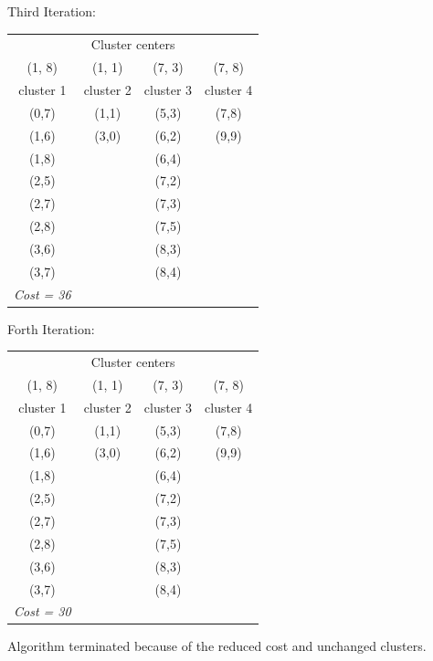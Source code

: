 \documentclass[10pt,a4paper]{article}
\begin{document}
\begin{enumerate}
			\clearpage
			Third Iteration:
			\begin{table}[h!]
				\centering
				\begin{tabular}{cccc}
					\toprule
					\multicolumn{4}{c}{Cluster centers} \\
					(1, 8) & (1, 1) & (7, 3) & (7, 8) \\
					cluster 1 &	cluster 2 &	cluster 3 & cluster 4 \\ \midrule
					(0,7) & (1,1) & (5,3) & (7,8) \\
					(1,6) & (3,0) & (6,2) & (9,9) \\
					(1,8) &  & (6,4) & \\
					(2,5) &  & (7,2) & \\
					(2,7) &  & (7,3) & \\
					(2,8) &  & (7,5) & \\
					(3,6) &  & (8,3) & \\ 
					(3,7) &  & (8,4) & \\ \midrule
					\textit{Cost = 36} & & & \\		
					\bottomrule					
				\end{tabular}
			\end{table}
		
			Forth Iteration:
			\begin{table}[h!]
				\centering
				\begin{tabular}{cccc}
					\toprule
					\multicolumn{4}{c}{Cluster centers} \\
					(1, 8) & (1, 1) & (7, 3) & (7, 8) \\
					cluster 1 &	cluster 2 &	cluster 3 & cluster 4 \\ \midrule
					(0,7) & (1,1) & (5,3) & (7,8) \\
					(1,6) & (3,0) & (6,2) & (9,9) \\
					(1,8) &  & (6,4) & \\
					(2,5) &  & (7,2) & \\
					(2,7) &  & (7,3) & \\
					(2,8) &  & (7,5) & \\
					(3,6) &  & (8,3) & \\ 
					(3,7) &  & (8,4) & \\ \midrule
					\textit{Cost = 30} & & & \\		
					\bottomrule					
				\end{tabular}
			\end{table}
			
			Algorithm terminated because of the reduced cost and unchanged clusters.
			

\end{enumerate}
\end{document}
